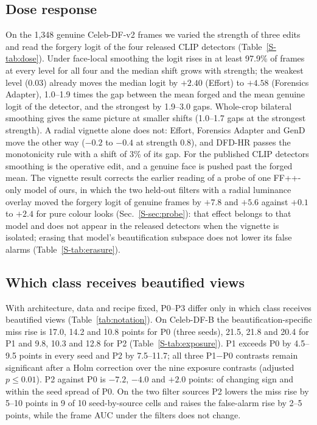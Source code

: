 \documentclass[conference]{IEEEtran}
\begin{document}
\subsection{Dose response}
\label{sec:mechanism}
On the 1,348 genuine Celeb-DF-v2 frames we varied the strength of three edits and read the forgery logit of the four released CLIP
detectors (Table~\ref{S-tab:dose}). Under face-local smoothing the logit rises in at least 97.9\% of frames at every level for all
four and the median shift grows with strength; the weakest level (0.03) already moves the median logit by $+2.40$ (Effort) to $+4.58$ (Forensics Adapter),
1.0--1.9 times the gap between the mean forged and the mean genuine logit of the detector, and the strongest by 1.9--3.0 gaps.
Whole-crop bilateral smoothing gives the same picture at smaller shifts (1.0--1.7 gaps at the strongest strength). A radial
vignette alone does not: Effort, Forensics Adapter and GenD move the other way ($-0.2$ to $-0.4$ at strength 0.8), and DFD-HR
passes the monotonicity rule with a shift of 3\% of its gap. For the published CLIP detectors smoothing is the operative edit, and
a genuine face is pushed past the forged mean. The vignette result corrects the earlier reading of a probe of one FF++-only model of
ours, in which the two held-out filters with a radial luminance overlay moved the forgery logit of genuine frames by $+7.8$ and
$+5.6$ against $+0.1$ to $+2.4$ for pure colour looks (Sec.~\ref{S-sec:probe}): that effect belongs to that model and does not
appear in the released detectors when the vignette is isolated; erasing that model's beautification subspace does not lower
its false alarms (Table~\ref{S-tab:erasure}).

\subsection{Which class receives beautified views}
\label{sec:exposure}
With architecture, data and recipe fixed, P0--P3 differ only in which class receives beautified views
(Table~\ref{tab:notation}). On Celeb-DF-B the beautification-specific miss rise is 17.0, 14.2 and 10.8 points for P0 (three
seeds), 21.5, 21.8 and 20.4 for P1 and 9.8, 10.3 and 12.8 for P2 (Table~\ref{S-tab:exposure}). P1 exceeds P0 by 4.5--9.5 points
in every seed and P2 by 7.5--11.7; all three P1$-$P0 contrasts remain significant after a Holm correction over the nine exposure
contrasts (adjusted $p\le0.01$). P2 against P0 is $-7.2$, $-4.0$ and $+2.0$ points: of changing sign and within the seed spread of
P0. On the two filter sources P2 lowers the miss rise by 5--10 points in 9 of 10 seed-by-source cells and raises the false-alarm
rise by 2--5 points, while the frame AUC under the filters does not change.
\end{document}
